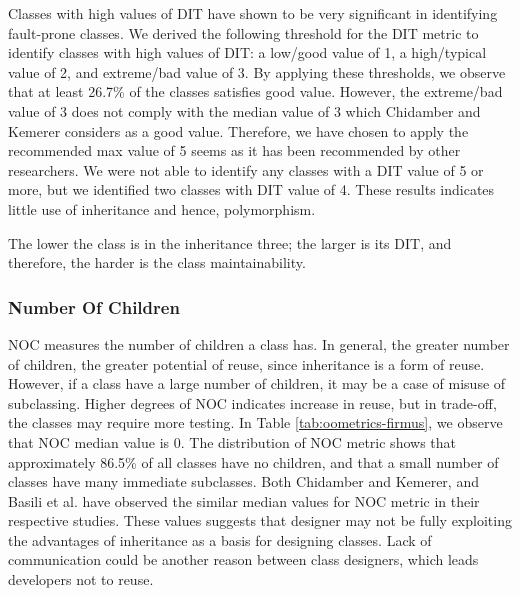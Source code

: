 Classes with high values of DIT have shown to be very significant in identifying fault-prone classes\cite{basili1996validation}. We derived the following threshold for the DIT metric to identify classes with high values of DIT: a low/good value of 1, a high/typical value of 2, and extreme/bad value of 3. By applying these thresholds, we observe that at least 26.7\% of the classes satisfies good value. However, the extreme/bad value of 3 does not comply with the median value of 3 which Chidamber and Kemerer\cite{chidamber1994metrics} considers as a good value. Therefore, we have chosen to apply the recommended max value of 5 seems as it has been recommended by other researchers. We were not able to identify any classes with a DIT value of 5 or more, but we identified two classes with DIT value of 4. These results indicates little use of inheritance and hence, polymorphism. 

The lower the class is in the inheritance three; the larger is its DIT, and therefore, the harder is the class maintainability. 

\subsubsection{Number Of Children}
NOC measures the number of children a class has. In general, the greater number of children, the greater potential of reuse, since inheritance is a form of reuse. However, if a class have a large number of children, it may be a case of misuse of subclassing\cite{basili1996validation}. Higher degrees of NOC indicates increase in reuse, but in trade-off, the classes may require more testing. In Table \ref{tab:oometrics-firmus}, we observe that NOC median value is 0. The distribution of NOC metric shows that approximately 86.5\% of all classes have no children, and that a small number of classes have many immediate subclasses. Both Chidamber and Kemerer\cite{chidamber1994metrics}, and Basili et al.\cite{basili1996validation} have observed the similar median values for NOC metric in their respective studies. These values suggests that designer may not be fully exploiting the advantages of inheritance as a basis for designing classes. Lack of communication could be another reason between class designers, which leads developers not to reuse.

